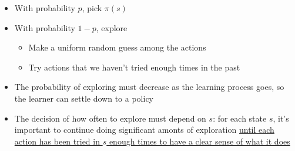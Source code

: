     \begin{itemize}
      \item With probability $ p $, pick $ \pi\left( s \right) $
      \item With probability $ 1 - p $, explore
      \begin{itemize}
        \item Make a uniform random guess among the actions
        \item Try actions that we haven't tried enough times in the past
      \end{itemize}

      \item The probability of exploring must decrease as the learning process
      goes, so the learner can settle down to a policy
      \item The decision of how often to explore must depend on $ s $:
      for each state $ s $, it's important to continue doing significant
      amonts of exploration \ul{until each action has been tried in $ s $
      enough times to have a clear sense of what it does}
    \end{itemize}

